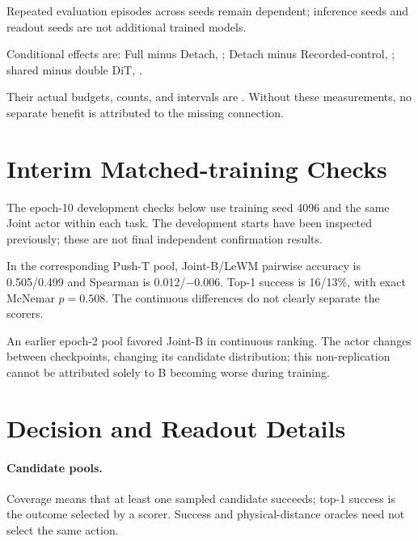Repeated evaluation episodes across seeds remain dependent; inference seeds and readout seeds are not additional trained models.

Conditional effects are: Full minus Detach, ; Detach minus Recorded-control, ; shared minus double DiT, .

Their actual budgets, counts, and intervals are . Without these measurements, no separate benefit is attributed to the missing connection.

\section{Interim Matched-training Checks}
\label{app:interim}
The epoch-10 development checks below use training seed 4096 and the same Joint actor within each task. The development starts have been inspected previously; these are not final independent confirmation results.

\begin{table}[t]
\centering\small

\caption{Epoch-10 development P3 success (\%) on 100 paired starts per task. Differences are Joint-B minus LeWM in percentage points, with paired 95\% intervals. Both intervals cross zero.}
\label{tab:interim_closed_loop}
\end{table}

In the corresponding Push-T pool, Joint-B/LeWM pairwise accuracy is 0.505/0.499 and Spearman is 0.012/$-$0.006. Top-1 success is 16/13\%, with exact McNemar $p=0.508$. The continuous differences do not clearly separate the scorers.

An earlier epoch-2 pool favored Joint-B in continuous ranking. The actor changes between checkpoints, changing its candidate distribution; this non-replication cannot be attributed solely to B becoming worse during training.

\section{Decision and Readout Details}
\label{app:diagnostics}
\paragraph{Candidate pools.}
Coverage means that at least one sampled candidate succeeds; top-1 success is the outcome selected by a scorer. Success and physical-distance oracles need not select the same action.

